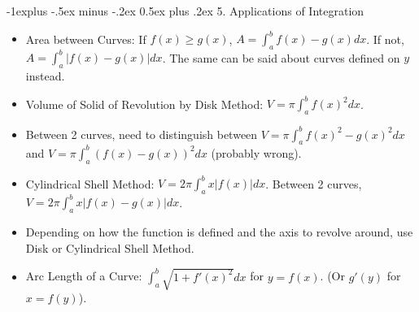 \documentclass[10pt, portrait]{article}
\makeatletter
\renewcommand{\section}{\@startsection{section}{1}{0mm}%
                                {-1ex plus -.5ex minus -.2ex}%
                                {0.5ex plus .2ex}%
                                {\normalfont\large\bfseries}}
\renewcommand{\section}{\@startsection{section}{2}{0mm}%
                                {-1explus -.5ex minus -.2ex}%
                                {0.5ex plus .2ex}%
                                {\normalfont\normalsize\bfseries}}
\makeatother
\begin{document}
\begin{multicols*}{2}
\section{5. Applications of Integration}
\begin{itemize}
    \item Area between Curves: If $f(x)\geq g(x)$, $A=\int_a^bf(x)-g(x)dx$. If not, $A=\int_a^b|f(x)-g(x)|dx$. The same can be said about curves defined on $y$ instead.
    \item Volume of Solid of Revolution by Disk Method: $V = \pi \int_a^bf(x)^2dx$.
    \item Between 2 curves, need to distinguish between $V = \pi \int_a^bf(x)^2-g(x)^2dx$ and $V = \pi \int_a^b(f(x)-g(x))^2dx$ (probably wrong).
    \item Cylindrical Shell Method: $V=2\pi\int_a^bx|f(x)|dx$. Between 2 curves, $V=2\pi\int_a^bx|f(x)-g(x)|dx$.
    \item Depending on how the function is defined and the axis to revolve around, use Disk or Cylindrical Shell Method.
    \item Arc Length of a Curve: $\int_a^b\sqrt{1+f'(x)^2}dx$ for $y=f(x)$. (Or $g'(y)$ for $x=f(y)$).
\end{itemize}


\end{multicols*}
\end{document}
